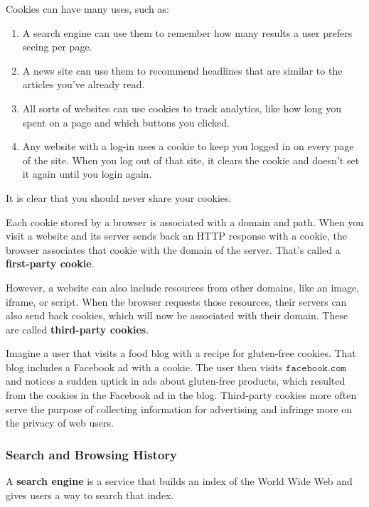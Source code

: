 \documentclass{article}
\begin{document}
  Cookies can have many uses, such as: 
  \begin{enumerate}
      \item A search engine can use them to remember how many results a user prefers seeing per page.
      \item A news site can use them to recommend headlines that are similar to the articles you've already read. 
      \item All sorts of websites can use cookies to track analytics, like how long you spent on a page and which buttons you clicked.
      \item Any website with a log-in uses a cookie to keep you logged in on every page of the site. When you log out of that site, it clears the cookie and doesn't set it again until you login again.
  \end{enumerate}
  It is clear that you should never share your cookies. 

  \begin{definition}
  Each cookie stored by a browser is associated with a domain and path. When you visit a website and its server sends back an HTTP response with a cookie, the browser associates that cookie with the domain of the server. That's called a \textbf{first-party cookie}. 

  However, a website can also include resources from other domains, like an image, iframe, or script. When the browser requests those resources, their servers can also send back cookies, which will now be associated with their domain. These are called \textbf{third-party cookies}.
  \end{definition}

  Imagine a user that visits a food blog with a recipe for gluten-free cookies. That blog includes a Facebook ad with a cookie. The user then visits $\texttt{facebook.com}$ and notices a sudden uptick in ads about gluten-free products, which resulted from the cookies in the Facebook ad in the blog. Third-party cookies more often serve the purpose of collecting information for advertising and infringe more on the privacy of web users. 

  \subsubsection{Search and Browsing History}
  \begin{definition}
  A \textbf{search engine} is a service that builds an index of the World Wide Web and gives users a way to search that index. 
  \end{definition}
\end{document}
